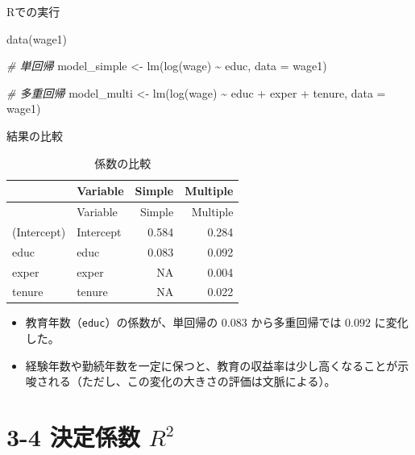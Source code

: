 \documentclass[
  ignorenonframetext,
]{beamer}
\newenvironment{Shaded}{\begin{snugshade}}{\end{snugshade}}
\newcommand{\AttributeTok}[1]{\textcolor[rgb]{0.77,0.63,0.00}{#1}}
\newcommand{\CommentTok}[1]{\textcolor[rgb]{0.56,0.35,0.01}{\textit{#1}}}
\newcommand{\FunctionTok}[1]{\textcolor[rgb]{0.00,0.00,0.00}{#1}}
\newcommand{\NormalTok}[1]{#1}
\newcommand{\OtherTok}[1]{\textcolor[rgb]{0.56,0.35,0.01}{#1}}
\newcommand{\SpecialCharTok}[1]{\textcolor[rgb]{0.00,0.00,0.00}{#1}}
\providecommand{\tightlist}{%
  \setlength{\itemsep}{0pt}\setlength{\parskip}{0pt}}
\begin{document}
\begin{frame}[fragile]{Rでの実行}
\protect\hypertarget{rux3067ux306eux5b9fux884c}{}
\begin{Shaded}
\begin{Highlighting}[]
\FunctionTok{data}\NormalTok{(wage1)}

\CommentTok{\# 単回帰}
\NormalTok{model\_simple }\OtherTok{\textless{}{-}} \FunctionTok{lm}\NormalTok{(}\FunctionTok{log}\NormalTok{(wage) }\SpecialCharTok{\textasciitilde{}}\NormalTok{ educ, }\AttributeTok{data =}\NormalTok{ wage1)}

\CommentTok{\# 多重回帰}
\NormalTok{model\_multi }\OtherTok{\textless{}{-}} \FunctionTok{lm}\NormalTok{(}\FunctionTok{log}\NormalTok{(wage) }\SpecialCharTok{\textasciitilde{}}\NormalTok{ educ }\SpecialCharTok{+}\NormalTok{ exper }\SpecialCharTok{+}\NormalTok{ tenure, }
                  \AttributeTok{data =}\NormalTok{ wage1)}
\end{Highlighting}
\end{Shaded}
\end{frame}

\begin{frame}[fragile]{結果の比較}
\protect\hypertarget{ux7d50ux679cux306eux6bd4ux8f03}{}
\begin{longtable}[]{@{}llrr@{}}
\caption{係数の比較}\tabularnewline
\toprule
& Variable & Simple & Multiple \\
\midrule
\endfirsthead
\toprule
& Variable & Simple & Multiple \\
\midrule
\endhead
(Intercept) & Intercept & 0.584 & 0.284 \\
educ & educ & 0.083 & 0.092 \\
exper & exper & NA & 0.004 \\
tenure & tenure & NA & 0.022 \\
\bottomrule
\end{longtable}

\begin{itemize}
\tightlist
\item
  教育年数（\texttt{educ}）の係数が、単回帰の \(0.083\) から多重回帰では
  \(0.092\) に変化した。
\item
  経験年数や勤続年数を一定に保つと、教育の収益率は少し高くなることが示唆される（ただし、この変化の大きさの評価は文脈による）。
\end{itemize}
\end{frame}

\hypertarget{ux6c7aux5b9aux4fc2ux6570-r2}{%
\section{\texorpdfstring{3-4 決定係数
\(R^2\)}{3-4 決定係数 R\^{}2}}\label{ux6c7aux5b9aux4fc2ux6570-r2}}
\end{document}
